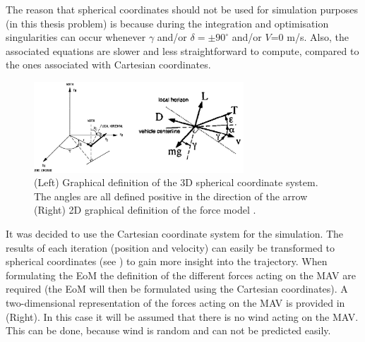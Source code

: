 The reason that spherical coordinates should not be used for simulation purposes (in this thesis problem) is because during the integration and optimisation singularities can occur whenever $\gamma$ and/or $\delta=\pm 90^{\circ}$ and/or $V$=0 m/s. Also, the associated equations are slower and less straightforward to compute, compared to the ones associated with Cartesian coordinates.



\begin{figure}[!ht]
\centering
\includegraphics[width=0.7\textwidth]{figures/launcher_methods/spherical_mooij1994motion_force_model_fanning1996model.jpg}
\caption{(Left) Graphical definition of the 3D spherical coordinate system. The angles are all defined positive in the direction of the arrow\cite{mooij1994motion} (Right) 2D graphical definition of the force model \cite{fanning1996model}.}
\label{fig:spherical_mooij1994motion_force_model_fanning1996model}
\end{figure}

It was decided to use the Cartesian coordinate system for the simulation. The results of each iteration (position and velocity) can easily be transformed to spherical coordinates (see ) to gain more insight into the trajectory. When formulating the \ac{EoM} the definition of the different forces acting on the \ac{MAV} are required (the \ac{EoM} will then be formulated using the Cartesian coordinates). A two-dimensional representation of the forces acting on the \ac{MAV} is provided in  (Right). In this case it will be assumed that there is no wind acting on the \ac{MAV}. This can be done, because wind is random and can not be predicted easily. 
%


